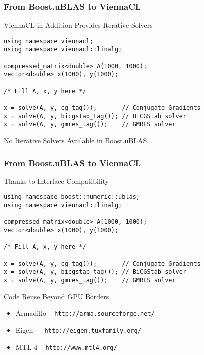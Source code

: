 \begin{frame}[fragile]
\frametitle{From Boost.uBLAS to ViennaCL}
\begin{block}{ViennaCL in Addition Provides Iterative Solvers}
  \begin{lstlisting}
using namespace viennacl;
using namespace viennacl::linalg;

compressed_matrix<double> A(1000, 1000);
vector<double> x(1000), y(1000);

/* Fill A, x, y here */

x = solve(A, y, cg_tag());       // Conjugate Gradients
x = solve(A, y, bicgstab_tag()); // BiCGStab solver
x = solve(A, y, gmres_tag());    // GMRES solver
  \end{lstlisting}
\end{block}

 \begin{block}{No Iterative Solvers Available in Boost.uBLAS...}
  \vspace*{1.72cm}
 \end{block}
\end{frame}


\begin{frame}[fragile]
\frametitle{From Boost.uBLAS to ViennaCL}
\begin{block}{Thanks to Interface Compatibility}
  \begin{lstlisting}
using namespace boost::numeric::ublas;
using namespace viennacl::linalg;

compressed_matrix<double> A(1000, 1000);
vector<double> x(1000), y(1000);

/* Fill A, x, y here */

x = solve(A, y, cg_tag());       // Conjugate Gradients
x = solve(A, y, bicgstab_tag()); // BiCGStab solver
x = solve(A, y, gmres_tag());    // GMRES solver
  \end{lstlisting} 
\end{block}

\begin{block}{Code Reuse Beyond GPU Borders}
 \begin{itemize}
  \item Armadillo \ { \footnotesize \verb|http://arma.sourceforge.net/|}
  \item Eigen \ { \ \footnotesize \verb|http://eigen.tuxfamily.org/|}
  \item MTL 4 \ { \footnotesize \verb|http://www.mtl4.org/|}
 \end{itemize}
\end{block}

\end{frame}


